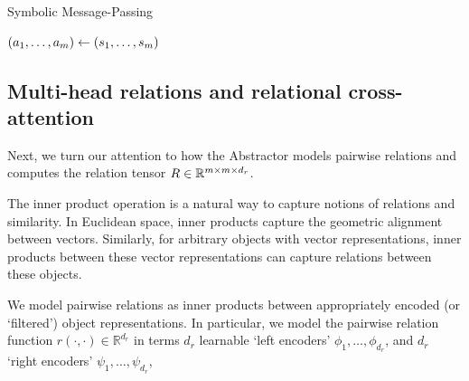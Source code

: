 \begin{algorithm}[ht!]
	\caption{Symbolic Message-Passing}\label{alg:symbolic_mp}

	\vspace{1em}

	\((a_1, \ldots, a_m) \gets (s_1, \ldots, s_m)\)

\end{algorithm}


\subsection{Multi-head relations and relational cross-attention}

Next, we turn our attention to how the Abstractor models pairwise relations and computes the relation tensor $R \in \mathbb{R}^{m \times m \times d_r}$.

The inner product operation is a natural way to capture notions of relations and similarity. In Euclidean space, inner products capture the geometric alignment between vectors. Similarly, for arbitrary objects with vector representations, inner products between these vector representations can capture relations between these objects.

We model pairwise relations as inner products between appropriately encoded (or `filtered') object representations. In particular, we model the pairwise relation function $r(\cdot, \cdot) \in \mathbb{R}^{d_r}$ in terms $d_r$ learnable `left encoders' $\phi_1, \ldots, \phi_{d_r}$, and $d_r$ `right encoders' $\psi_1, \ldots, \psi_{d_r}$,

